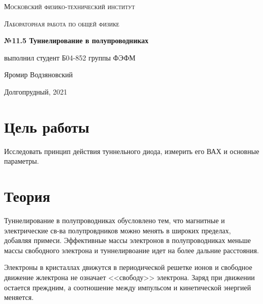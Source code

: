 \documentclass[a4paper]{article}
\begin{document}
\graphicspath{ {pictures/} }

\begin{titlepage}
	\centering
	\vspace{5cm}
    {\scshape\LARGE Московский физико-технический институт\par}
	\vspace{5cm}
	{\scshape\Large Лабораторная работа по общей физике \par}
	\vspace{1cm}
    {\huge\bfseries  №11.5 Туннелирование в полупроводниках  \par}
	\vspace{1cm}
	\vfill
    \begin{flushright}
        {\large выполнил студент Б04-852 группы ФЭФМ}\par
        \vspace{0.3cm}
        {\LARGE Яромир Водзяновский}
    \end{flushright}
	\vfill
Долгопрудный, 2021
\end{titlepage}

\pagestyle{fancy} 
\fancyfoot[C]{ \noindent\rule{\textwidth}{0.4pt} \thepage }

\tableofcontents

\newpage



\section{Цель работы}

Исследовать принцип действия туннельного диода, измерить его ВАХ и основные параметры.


\section{Теория}

Туннелирование в полупроводниках обусловлено тем, что магнитные и электрические св-ва полупровдников можно менять в широких пределах, добавляя примеси. 
Эффективные массы электронов в полупроводниках меньше массы свободного электрона и туннелирвоание идет на более дальние расстояния.  \par 

Электроны в кристаллах движутся в периодической решетке ионов и свободное движение жлектрона не означает <<свободу>> электрона. Заряд при движении остается преждним, а
соотношение между импульсом и кинетической энергией меняется.  \par 
\end{document}
